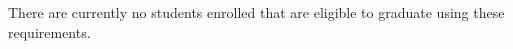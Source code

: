 \documentclass[12pt,twoside]{article}
\begin{document}
There are currently no students enrolled that are eligible to graduate
using these requirements.












\end{document}
